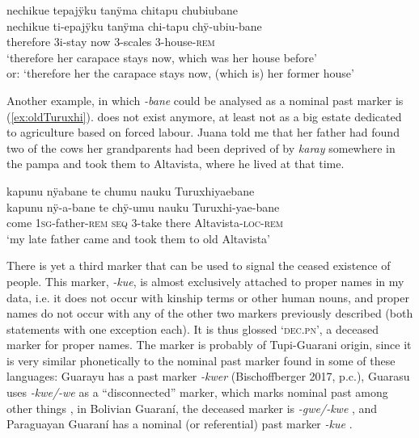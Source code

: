\ea\label{ex:former-house}
\begingl 
\glpreamble nechikue tepajÿku tanÿma chitapu chubiubane\\
\gla nechikue ti-epajÿku tanÿma chi-tapu chÿ-ubiu-bane\\ 
\glb therefore 3i-stay now 3-scales 3-house-\textsc{rem}\\ 
\glft ‘therefore her carapace stays now, which was her house before’\\or: ‘therefore her the carapace stays now, (which is) her former house’\\ 
\endgl
\trailingcitation{[rxx-n121128s.24]}
\xe

Another example, in which \textit{-bane} could be analysed as a nominal past marker is (\ref{ex:oldTuruxhi}).  does not exist anymore, at least not as a big estate dedicated to agriculture based on forced labour. Juana told me that her father had found two of the cows her grandparents had been deprived of by \textit{karay} somewhere in the pampa and took them to Altavista, where he lived at that time.

\ea\label{ex:oldTuruxhi}
\begingl
\glpreamble kapunu nÿabane te chumu nauku Turuxhiyaebane\\
\gla kapunu nÿ-a-bane te chÿ-umu nauku Turuxhi-yae-bane\\
\glb come 1\textsc{sg}-father-\textsc{rem} \textsc{seq} 3-take there Altavista-\textsc{loc}-\textsc{rem}\\
\glft ‘my late father came and took them to old Altavista’
\endgl
\trailingcitation{[jxx-e150925l-1.238]}
\xe
{}

There is yet a third marker that can be used to signal the ceased existence of people. This marker, \textit{-kue}, is almost exclusively attached to proper names in my data, i.e. it does not occur with kinship terms or other human nouns, and proper names do not occur with any of the other two markers previously described (both statements with one exception each). It is thus glossed ‘\textsc{dec.pn}’, a deceased marker for proper names. The marker is probably of Tupi-Guarani origin, since it is very similar phonetically to the nominal past marker found in some of these languages: Guarayu has a past marker \textit{-kwer} (Bischoffberger 2017, p.c.), Guarasu uses \textit{-kwe/-we} as a “disconnected” marker, which marks nominal past among other things \citep[237--238]{RamirezAL2017}, in Bolivian Guaraní, the deceased marker is \textit{-gwe/-kwe} \citep[339]{Gustafson2014}, and Paraguayan Guaraní has a nominal (or referential) past marker \textit{-kue} \citep[34]{Nordhoff2004}. 

